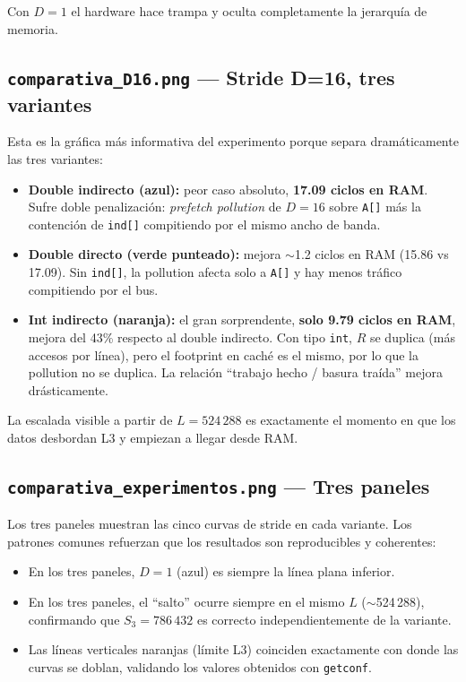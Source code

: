 \documentclass[12pt,a4paper]{article}
\begin{document}
\begin{tcolorbox}[clave, title={Conclusión de esta gráfica}]
Con $D=1$ el hardware hace trampa y oculta completamente la jerarquía de memoria.
\end{tcolorbox}

\subsection{\texttt{comparativa\_D16.png} --- Stride D=16, tres variantes}

Esta es la gráfica más informativa del experimento porque separa dramáticamente las tres variantes:

\begin{itemize}[leftmargin=1.5em]
  \item \textbf{Double indirecto (azul):} peor caso absoluto, \textbf{17.09 ciclos en RAM}. Sufre doble penalización: \emph{prefetch pollution} de $D=16$ sobre \texttt{A[]} más la contención de \texttt{ind[]} compitiendo por el mismo ancho de banda.

  \item \textbf{Double directo (verde punteado):} mejora $\sim$1.2 ciclos en RAM (15.86 vs 17.09). Sin \texttt{ind[]}, la pollution afecta solo a \texttt{A[]} y hay menos tráfico compitiendo por el bus.

  \item \textbf{Int indirecto (naranja):} el gran sorprendente, \textbf{solo 9.79 ciclos en RAM}, mejora del 43\% respecto al double indirecto. Con tipo \texttt{int}, $R$ se duplica (más accesos por línea), pero el footprint en caché es el mismo, por lo que la pollution no se duplica. La relación ``trabajo hecho / basura traída'' mejora drásticamente.
\end{itemize}

La escalada visible a partir de $L=524\,288$ es exactamente el momento en que los datos desbordan L3 y empiezan a llegar desde RAM.

\subsection{\texttt{comparativa\_experimentos.png} --- Tres paneles}

Los tres paneles muestran las cinco curvas de stride en cada variante. Los patrones comunes refuerzan que los resultados son reproducibles y coherentes:

\begin{itemize}[leftmargin=1.5em]
  \item En los tres paneles, $D=1$ (azul) es siempre la línea plana inferior.
  \item En los tres paneles, el ``salto'' ocurre siempre en el mismo $L$ ($\sim$524\,288), confirmando que $S_3=786\,432$ es correcto independientemente de la variante.
  \item Las líneas verticales naranjas (límite L3) coinciden exactamente con donde las curvas se doblan, validando los valores obtenidos con \texttt{getconf}.
\end{itemize}
\end{document}
